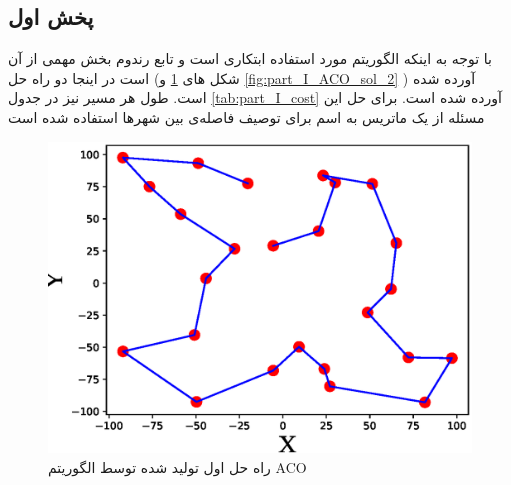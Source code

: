 
\subsection{پخش اول}\label{sec:part_I}
با توجه به اینکه الگوریتم مورد استفاده ابتکاری است و تابع رندوم بخش مهمی از آن است در اینجا دو راه حل (شکل های
\ref{fig:part_I_ACO_sol_1}
و 
\ref{fig:part_I_ACO_sol_2}
) آورده شده است. طول هر مسیر نیز در جدول \ref{tab:part_I_cost}
آورده شده است. برای حل این مسئله از یک ماتریس به اسم
 برای توصیف فاصله‌ی بین شهرها استفاده شده است

\begin{figure}[H]\label{fig:part_I_ACO_sol_1}
	\caption{راه حل اول تولید شده توسط الگوریتم ACO} 
	\centering 
	\includegraphics[width=16cm]{../Figure/Q2/ACO_solution} 
\end{figure}

